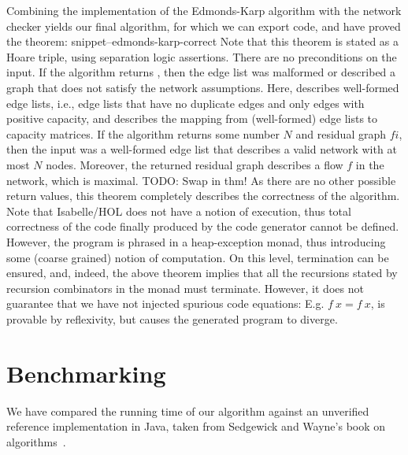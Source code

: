 \documentclass{llncs}
\newcommand{\Snippet}[1]{\csname snippet--#1\endcsname}
\begin{document}
  Combining the implementation of the Edmonds-Karp algorithm with the network checker yields our final algorithm,
  for which we can export code, and have proved the theorem: 
  \Snippet{edmonds-karp-correct}
  Note that this theorem is stated as a Hoare triple, using separation logic assertions. There are no preconditions on the input.
  If the algorithm returns , then the edge list was malformed or described a graph that does not satisfy the network assumptions.
  Here,  describes well-formed edge lists, i.e., edge lists that have no duplicate edges and only edges with positive capacity,
  and  describes the mapping from (well-formed) edge lists to capacity matrices.
  If the algorithm returns some number $N$ and residual graph $fi$, then the input was a well-formed edge list that describes a valid network with at most $N$ nodes.
  Moreover, the returned residual graph describes a flow $f$ in the network, which is maximal. TODO: Swap in thm!
  As there are no other possible return values, this theorem completely describes the correctness of the algorithm. 
  Note that Isabelle/HOL does not have a notion of execution, thus total correctness of the code finally produced by the code 
  generator cannot be defined. However, the program is phrased in a heap-exception monad, thus introducing some (coarse grained) notion of
  computation. On this level, termination can be ensured, and, indeed, the above theorem implies that all the recursions stated by recursion 
  combinators in the monad must terminate. However, it does not guarantee that we have not injected spurious code equations: E.g. $f~x = f~x$,
  is provable by reflexivity, but causes the generated program to diverge.

\section{Benchmarking}\label{sec:benchmark}
  We have compared the running time of our algorithm against an unverified reference implementation in Java, taken from Sedgewick and Wayne's book on algorithms~\cite{SeWa11}.
  
\end{document}
